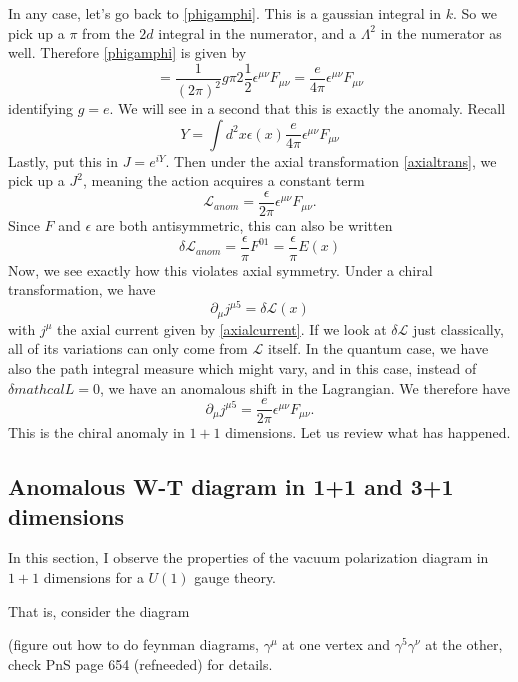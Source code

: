 \documentclass[main.tex]{subfiles}
\begin{document}
In any case, let's go back to \ref{phigamphi}. This is a gaussian integral in $k$. So we pick up a $\pi$ from the $2d$ integral in the numerator, and a $\Lambda^2$ in the numerator as well. Therefore \ref{phigamphi} is given by
\[
= \frac{1}{(2\pi)^2} g \pi 2 \frac{1}{2} \epsilon^{\mu \nu} F_{\mu \nu} = \frac{e}{4\pi} \epsilon^{\mu \nu} F_{\mu \nu}
\]
identifying $g = e$. We will see in a second that this is exactly the anomaly. Recall
\[
Y = \int d^2 x \epsilon(x) \frac{e}{4\pi} \epsilon^{\mu \nu} F_{\mu \nu}
\]
Lastly, put this in $J = e^{iY}$. Then under the axial transformation \ref{axialtrans}, we pick up a $J^2$, meaning the action acquires a constant term
\[
\mathcal{L}_{anom} = \frac{\epsilon}{2\pi} \epsilon^{\mu \nu}F_{\mu \nu}.
\]
Since $F$ and $\epsilon$ are both antisymmetric, this can also be written
\[
\delta \mathcal{L}_{anom} = \frac{\epsilon}{\pi} F^{01} = \frac{\epsilon}{\pi} E(x)
\]
Now, we see exactly how this violates axial symmetry. Under a chiral transformation, we have
\[
\partial_\mu j^{\mu 5} = \delta \mathcal{L} (x)
\]
with $j^\mu$ the axial current given by \ref{axialcurrent}. If we look at $\delta \mathcal{L}$ just classically, all of its variations can only come from $\mathcal{L}$ itself. In the quantum case, we have also the path integral measure which might vary, and in this case, instead of $\delta mathcal{L} = 0$, we have an anomalous shift in the Lagrangian. We therefore have
\begin{equation} \label{11chiralanomaly}
\partial_\mu j^{\mu 5} = \frac{e}{2\pi} \epsilon^{\mu \nu} F_{\mu \nu}.
\end{equation} 
This is the chiral anomaly in $1+1$ dimensions. Let us review what has happened.
\subsection{Anomalous W-T diagram in 1+1 and 3+1 dimensions}
In this section, I observe the properties of the vacuum polarization diagram in $1+1$ dimensions for a $U(1)$ gauge theory.

That is, consider the diagram

(figure out how to do feynman diagrams, $\gamma^\mu$ at one vertex and $\gamma^5 \gamma^\nu$ at the other, check PnS page 654 (refneeded) for details. 
\end{document}

